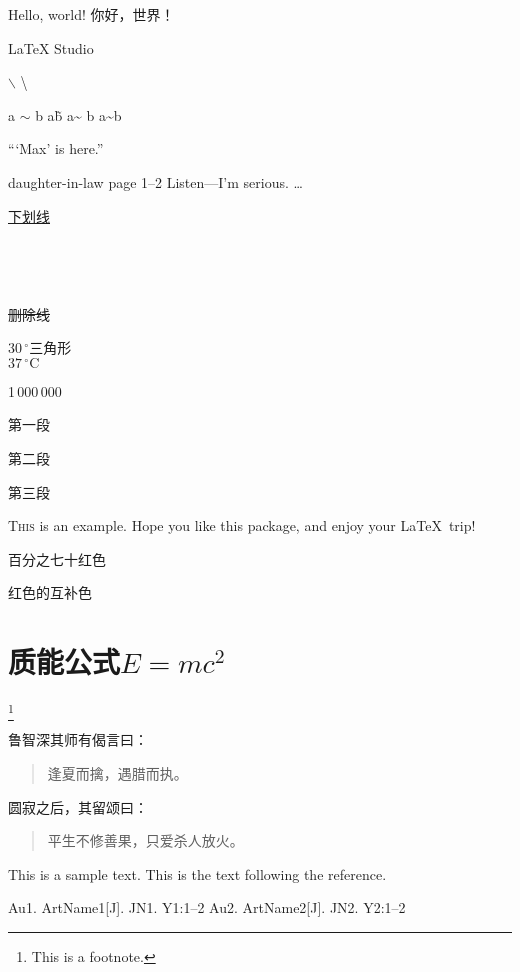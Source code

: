 \documentclass[a4paper, zihao = -4, linespread = 1]{ctexart}
\begin{document}
	Hello, world!
	你好，世界！\par

	\LaTeX{} Studio

	$\backslash$ \textbackslash \texttt{}

	a $\sim$ b
	a\~ b
	a\~{} b
	a\textasciitilde b

	``\thinspace `Max' is here.''

	daughter-in-law
	page 1--2
	Listen---I'm serious.
	\ldots %

	\uline{下划线} \\
	 \\
	 \\
	 \\
	 \\
	\sout{删除线} \\

	$30\,^{\circ}$三角形 \\
	$37\,^{\circ}\mathrm{C}$

	\mbox{1\,000\,000} %

	第一段

	\mbox{}

	第二段 \par
	第三段

	\setlength{\parskip}{0pt}

	\lettrine{T}{his} is an example. Hope you like this package, and enjoy your \LaTeX\ trip!

	{\color{red!70} 百分之七十红色} \par
	{\color{-red} 红色的互补色}

	\section{质能公式\texorpdfstring{$E=mc^2$}{E=mc\textasciicircum 2}}

	\footnote{This is a footnote.}

	鲁智深其师有偈言曰：
	\begin{quote}
	逢夏而擒，遇腊而执。
	\end{quote}
	圆寂之后，其留颂曰：
	\begin{quotation}
	平生不修善果，只爱杀人放火。
	\end{quotation}

	This is a sample text.\cite{author1.year1,author2.year2}
	This is the text following the reference.

	\begin{thebibliography}{99} %
		\addtolength{\itemsep}{-2ex} %
		Au1. ArtName1[J]. JN1. Y1:1--2
		Au2. ArtName2[J]. JN2. Y2:1--2
	\end{thebibliography}
\end{document}
